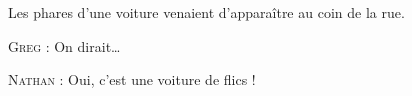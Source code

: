 Les phares d’une voiture venaient d’apparaître au coin de la rue.

%

\begin{dialogue}

\textsc{Greg} : On dirait…

\textsc{Nathan} : Oui, c’est une voiture de flics !

\end{dialogue}

